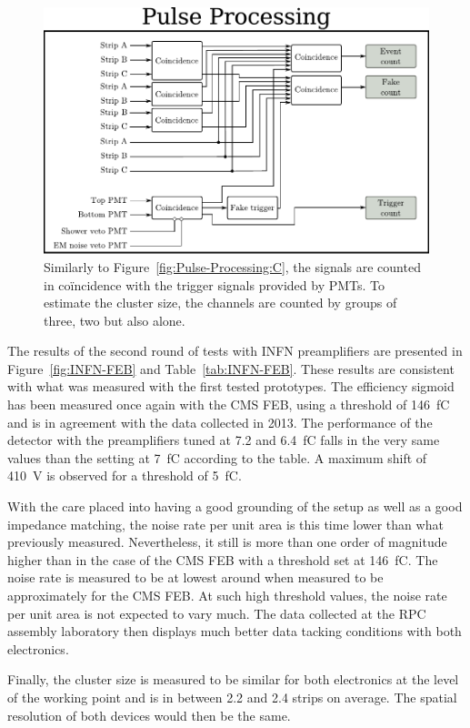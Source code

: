 	\begin{figure}[H]
		\centering
		\includegraphics[width=.8\linewidth]{fig/chapt6/pulse-processing-2014.pdf}
		\caption{\label{fig:Pulse-Processing-904} Similarly to Figure~\ref{fig:Pulse-Processing:C}, the signals are counted in coïncidence with the trigger signals provided by PMTs. To estimate the cluster size, the channels are counted by groups of three, two but also alone.}
	\end{figure}
	
	The results of the second round of tests with INFN preamplifiers are presented in Figure~\ref{fig:INFN-FEB} and Table~\ref{tab:INFN-FEB}. These results are consistent with what was measured with the first tested prototypes. The efficiency sigmoid has been measured once again with the CMS FEB, using a threshold of \SI{146}{fC} and is in agreement with the data collected in 2013. The performance of the detector with the preamplifiers tuned at 7.2 and \SI{6.4}{fC} falls in the very same values than the setting at \SI{7}{fC} according to the table. A maximum shift of \SI{410}{V} is observed for a threshold of \SI{5}{fC}.
	
	With the care placed into having a good grounding of the setup as well as a good impedance matching, the noise rate per unit area is this time lower than what previously measured. Nevertheless, it still is more than one order of magnitude higher than in the case of the CMS FEB with a threshold set at \SI{146}{fC}. The noise rate is measured to be at lowest around  when measured to be approximately  for the CMS FEB. At such high threshold values, the noise rate per unit area is not expected to vary much. The data collected at the RPC assembly laboratory then displays much better data tacking conditions with both electronics.
	
	Finally, the cluster size is measured to be similar for both electronics at the level of the working point and is in between 2.2 and 2.4 strips on average. The spatial resolution of both devices would then be the same.
	

